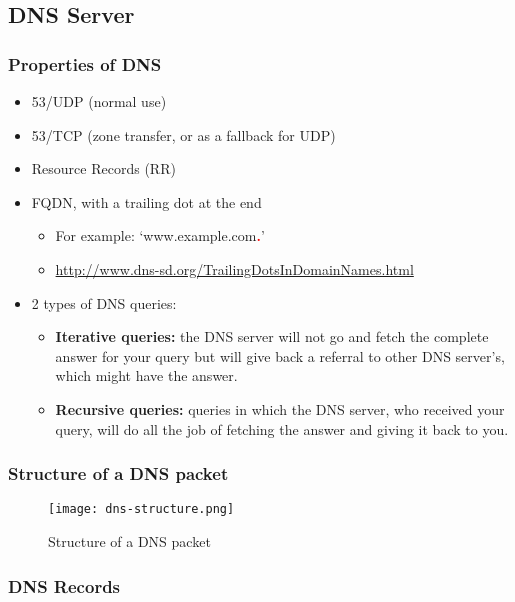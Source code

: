 \documentclass{article}
\begin{document}
\subsection{DNS Server}

\subsubsection{Properties of DNS}

\begin{itemize}
    \item 53/UDP (normal use)
    \item 53/TCP (zone transfer, or as a fallback for UDP)
    \item Resource Records (RR)
    \item FQDN, with a trailing dot at the end
    \begin{itemize}
        \item For example: `www.example.com\textbf{\textcolor{red}{.}}'
        \item \url{http://www.dns-sd.org/TrailingDotsInDomainNames.html}
    \end{itemize}
    \item 2 types of DNS queries:
    \begin{itemize}
        \item \textbf{Iterative queries:} the DNS server will not go and fetch the complete answer for your query but will give back a referral to other DNS server's, which might have the answer.
        \item \textbf{Recursive queries:} queries in which the DNS server, who received your query, will do all the job of fetching the answer and giving it back to you.
    \end{itemize}
\end{itemize}

\subsubsection{Structure of a DNS packet}

\begin{figure}[H]
    \centering
    \texttt{[image: dns-structure.png]}
    \caption{Structure of a DNS packet}
\end{figure}

\subsubsection{DNS Records}
\end{document}
